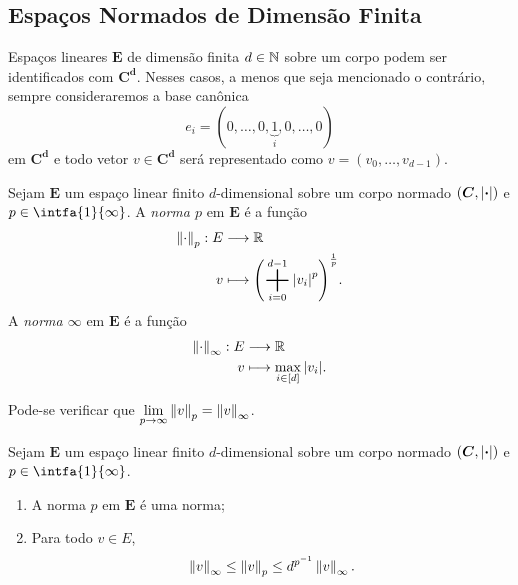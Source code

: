 \subsection{Espaços Normados de Dimensão Finita}

Espaços lineares $\bm E$ de dimensão finita $d \in \mathbb{N}$ sobre um corpo podem ser identificados com $\bm{C^d}$. Nesses casos, a menos que seja mencionado o contrário, sempre consideraremos a base canônica
	\begin{equation*}
	e_i = (0,\dots,0,\underbrace{1}_i,0,\dots,0)
	\end{equation*}
em $\bm{C^d}$ e todo vetor $v \in \bm{C^d}$ será representado como $v=(v_0,\dots,v_{d-1})$.

\begin{defi}
Sejam $\bm E$ um espaço linear finito $d$-dimensional sobre um corpo normado $(\bm C,\left\vert{\bm{\cdot}}\right\vert)$ e $p \in \intfa{1}{\infty}$. A \emph{norma $p$} em $\bm E$ é a função
	\begin{align*}
	\func{\nor{\cdot}_p}{E}{\R}{v}{\left(\sum_{i=0}^{d-1}\abs{v_i}^p\right)^{\frac{1}{p}}}.
	\end{align*}
A \emph{norma $\infty$} em $\bm E$ é a função
	\begin{align*}
	{\left\Vert{\cdot}\right\Vert_\infty}: {E} &\longrightarrow {\mathbb{R}} \\{v} &\longmapsto {\max_{i \in [d]} \left\vert{v_i}\right\vert}.
	\end{align*}
\end{defi}

Pode-se verificar que $\displaystyle\lim_{p \rightarrow \infty} \left\Vert{v}\right\Vert_p = \left\Vert{v}\right\Vert_\infty$.

\begin{prop}
Sejam $\bm E$ um espaço linear finito $d$-dimensional sobre um corpo normado $(\bm C,\left\vert{\bm{\cdot}}\right\vert)$ e $p \in \intfa{1}{\infty}$.
	\begin{enumerate}
	\item A norma $p$ em $\bm E$ é uma norma;
	\item Para todo $v \in E$,
		\begin{equation*}
		\left\Vert{v}\right\Vert_\infty \leq \left\Vert{v}\right\Vert_p \leq d^{p^{-1}}\left\Vert{v}\right\Vert_\infty.
		\end{equation*}
	\end{enumerate}
\end{prop}

